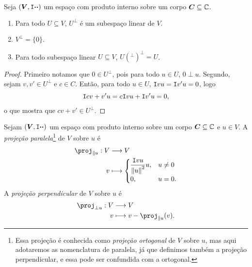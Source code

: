 \begin{prop}
Seja $(\bm V,\mathtt I{\bm{\cdot}}{\bm{\cdot}})$ um espaço com produto interno sobre um corpo $\bm C \subseteq \mathbb{C}$.
	\begin{enumerate}
	\item Para todo $U \subseteq V$, $U^\perp$ é um subespaço linear de $V$.
	\item $V^\perp = \{0\}$.
	\item Para todo subespaço linear $U \subseteq V$, $U(^\perp)^\perp = U$.
	\end{enumerate}
\end{prop}
\begin{proof}
Primeiro notamos que $0 \in U^\perp$, pois para todo $u \in U$, $0 \perp u$. Segundo, sejam $v,v' \in U^\perp$ e $c \in C$. Então, para todo $u \in U$, $\mathtt I{v}{u} = \mathtt I{v'}{u} = 0$, logo
	\begin{equation*}
	\mathtt I{cv+v'}{u} = c\mathtt I{v}{u} + \mathtt I{v'}{u} = 0,
	\end{equation*}
o que mostra que $cv+v' \in U^\perp$.
\end{proof}

\begin{defi}
Sejam $(\bm V,\mathtt I{\bm{\cdot}}{\bm{\cdot}})$ um espaço com produto interno sobre um corpo $\bm C \subseteq \mathbb{C}$ e $u \in V$. A \emph{projeção paralela}\footnote{Essa projeção é conhecida como \emph{projeção ortogonal} de $V$ sobre $u$, mas aqui adotaremos as nomenclatura de paralela, já que definimos também a projeção perpendicular, e essa pode ser confundida com a ortogonal.} de $V$ sobre $u$ é
	\begin{align*}
	\func{\proj_{\parallel u}}{V}{V}{v}{
		\begin{cases}
			\displaystyle\frac{\inte{v}{u}}{\nor{u}^2}u,& u \neq 0 \\
			0,& u=0.
		\end{cases}
	}
	\end{align*}
A \emph{projeção perpendicular} de $V$ sobre $u$ é
	\begin{align*}
	\func{\proj_{\perp u}}{V}{V}{v}{v - \proj_{\parallel u}(v).}
	\end{align*}
\end{defi}

